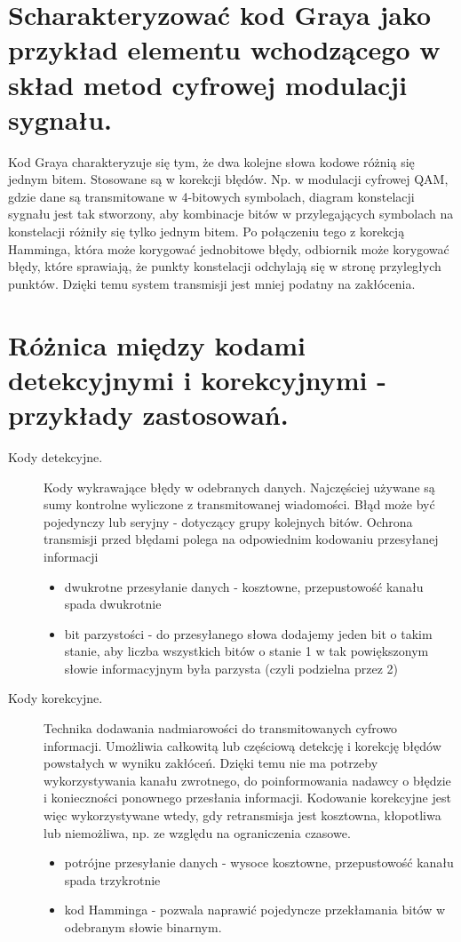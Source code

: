 \documentclass[12pt,a4paper]{article}
\begin{document}
	\section{Scharakteryzować kod Graya jako przykład elementu wchodzącego w skład metod cyfrowej modulacji sygnału.}
	Kod Graya charakteryzuje się tym, że dwa kolejne słowa kodowe różnią się jednym bitem. Stosowane są w korekcji błędów. Np. w modulacji cyfrowej QAM, gdzie dane są transmitowane w 4-bitowych symbolach, diagram konstelacji sygnału jest tak stworzony, aby kombinacje bitów w przylegających symbolach na konstelacji różniły się tylko jednym bitem. Po połączeniu tego z korekcją Hamminga, która może korygować jednobitowe błędy, odbiornik może korygować błędy, które sprawiają, że punkty konstelacji odchylają się w stronę przyległych punktów. Dzięki temu system transmisji jest mniej podatny na zakłócenia.

	\section{Różnica między kodami detekcyjnymi i korekcyjnymi - przykłady zastosowań.}
	\begin{description}
		\item[Kody detekcyjne.] Kody wykrawające błędy w odebranych danych. Najczęściej używane są sumy kontrolne wyliczone z transmitowanej wiadomości. Błąd może być pojedynczy lub seryjny - dotyczący grupy kolejnych bitów. Ochrona transmisji przed błędami polega na odpowiednim kodowaniu przesyłanej informacji
		\begin{itemize}
			\item dwukrotne przesyłanie danych - kosztowne, przepustowość kanału spada dwukrotnie
			\item bit parzystości - do przesyłanego słowa dodajemy jeden bit o takim stanie, aby liczba wszystkich bitów o stanie 1 w tak powiększonym słowie informacyjnym była parzysta (czyli podzielna przez 2)
		\end{itemize}
		\item[Kody korekcyjne.] Technika dodawania nadmiarowości do transmitowanych cyfrowo informacji. Umożliwia całkowitą lub częściową detekcję i korekcję błędów powstałych w wyniku zakłóceń. Dzięki temu nie ma potrzeby wykorzystywania kanału zwrotnego, do poinformowania nadawcy o błędzie i konieczności ponownego przesłania informacji. Kodowanie korekcyjne jest więc wykorzystywane wtedy, gdy retransmisja jest kosztowna, kłopotliwa lub niemożliwa, np. ze względu na ograniczenia czasowe.
		\begin{itemize}
			\item potrójne przesyłanie danych - wysoce kosztowne, przepustowość kanału spada trzykrotnie
			\item kod Hamminga - pozwala naprawić pojedyncze przekłamania bitów w odebranym słowie binarnym. 
		\end{itemize}
	\end{description}
\end{document}
